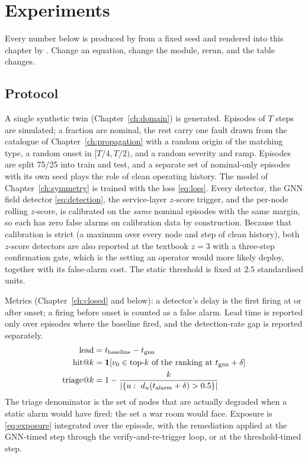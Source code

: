 \chapter{Experiments}
\label{ch:experiments}

Every number below is produced by  from a fixed seed and rendered into this
chapter by . Change an equation, change the module, rerun, and
the table changes.

\section{Protocol}
A single synthetic twin (Chapter~\ref{ch:domain}) is generated. Episodes of $T$ steps are
simulated; a fraction are nominal, the rest carry one fault drawn from the catalogue of
Chapter~\ref{ch:propagation} with a random origin of the matching type, a random onset in
$[T/4,T/2)$, and a random severity and ramp. Episodes are split 75/25 into train and test, and a
separate set of nominal-only episodes with its own seed plays the role of clean operating history.
The model of Chapter~\ref{ch:symmetry} is trained with the loss \eqref{eq:loss}.
Every detector, the GNN field detector \eqref{eq:detection}, the service-layer $z$-score trigger,
and the per-node rolling $z$-score, is calibrated on the \emph{same} nominal episodes with the
same margin, so each has zero false alarms on calibration data by construction. Because that
calibration is strict (a maximum over every node and step of clean history), both $z$-score
detectors are also reported at the textbook $z=3$ with a three-step confirmation gate, which is
the setting an operator would more likely deploy, together with its false-alarm cost. The static
threshold is fixed at $2.5$ standardised units.

Metrics (Chapter~\ref{ch:closed} and below): a detector's delay is the first firing at or after
onset; a firing before onset is counted as a false alarm. Lead time is reported only over episodes
where the baseline fired, and the detection-rate gap is reported separately.
\begin{align}
\text{lead}&=t_{\text{baseline}}-t_{\text{gnn}} \label{eq:leadtime}\\
\text{hit@}k&=\ind{v_0\in\text{top-}k\text{ of the ranking at }t_{\text{gnn}}+\delta} \label{eq:hitk}\\
\text{triage@}k&=1-\frac{k}{|\{u:\ d_u(t_{\text{alarm}}+\delta)>0.5\}|} \label{eq:triage}
\end{align}
The triage denominator is the set of nodes that are actually degraded when a static alarm would
have fired: the set a war room would face. Exposure is \eqref{eq:exposure} integrated over the
episode, with the remediation applied at the GNN-timed step through the verify-and-re-trigger loop,
or at the threshold-timed step.

